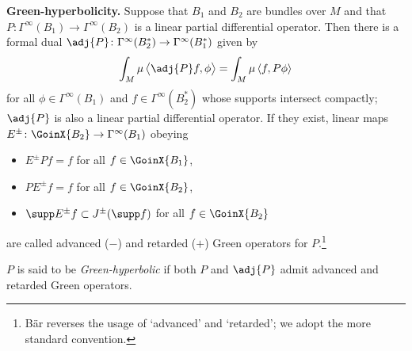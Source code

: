 {\bf Green-hyperbolicity.} Suppose that $B_1$ and $B_2$ are bundles over $M$ and that $P\colon \Gamma^\infty(B_1)\to \Gamma^\infty(B_2)$ is a linear partial differential operator. Then there is a formal dual $\adj{P}\colon \Gamma^\infty(B_2^*)\to \Gamma^\infty(B_1^*)$ given by
 \begin{equation*}
 	\int_M \mu\, \big\langle \adj{P}f, \phi\big\rangle = \int_M\mu\, \langle f, P\phi\rangle
 \end{equation*}
 for all $\phi\in \Gamma^\infty(B_1)$ and $f\in \Gamma^\infty(B_2^*)$ whose supports intersect compactly; $\adj{P}$ is also a linear partial differential operator.
 If they exist, linear maps $E^\pm\colon \GoinX{B_2}\to \Gamma^\infty(B_1)$ obeying
 \begin{itemize}\itemsep=0pt
 	\item[(G1)] $E^\pm P f=f$ for all $f\in\GoinX{B_1}$,
 	\item[(G2)] $P E^\pm f = f$ for all $f\in\GoinX{B_2}$,
 	\item[(G3)] $\supp E^\pm f \subset J^\pm (\supp f)$ for all $f\in\GoinX{B_2}$
 \end{itemize}
 are called advanced ($-$) and retarded ($+$) Green operators for $P$.\footnote{B\"ar reverses the usage of `advanced' and `retarded'; we adopt the more standard convention.}
 \begin{Definition}
 	$P$ is said to be \emph{Green-hyperbolic} if both $P$ and $\adj{P}$ admit advanced and retarded Green operators.
 \end{Definition}

